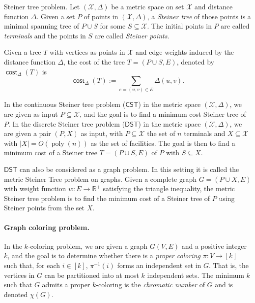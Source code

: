 \documentclass{article}\providecommand{\DeclareRedundantLanguages}[2]{}\usepackage[a4paper,margin=20mm]{geometry}
\DeclareMathOperator{\cost}{\mathsf{cost}}
\DeclareMathOperator{\poly}{poly}
\newcommand{\1}{\textbf{1}}
\newcommand{\cst}{$\mathsf{CST}$\xspace}
\newcommand{\dst}{$\mathsf{DST}$\xspace}
\begin{document}
\begin{paragraph}{Steiner tree problem.}  Let  $(\mathcal{X}, \Delta)$ be a metric space on set $\mathcal{X}$ and distance function $\Delta$. 
Given a set $P$ of points in $(\mathcal{X}, \Delta)$, a \textit{Steiner tree} of those points is a minimal spanning tree of $P \cup S$ for some $S\subseteq \mathcal{X}$. The initial points in $P$ are called \textit{terminals} and the points in $S$ are called \textit{Steiner points}. 

Given a tree $T$ with vertices as points in $\mathcal{X}$ and edge weights induced by the distance function $\Delta$, the cost of the tree $T = (P \cup S, E)$, denoted by $\cost_{\Delta}(T)$ is 
\[
 \cost_{\Delta}(T):=\sum_{e = (u,v) \in E} \Delta(u, v).
\]


In the continuous Steiner tree problem (\cst) in the metric space $(\mathcal{X}, \Delta)$, we are given as input $P \subseteq \mathcal{X}$, and the goal is to find a minimum cost Steiner tree of $P$. In the discrete Steiner tree problem (\dst) in the metric space $(\mathcal{X}, \Delta)$, we are given a pair $(P, X)$ as input, with $P \subseteq \mathcal{X}$ the set of $n$ terminals and $X \subseteq \mathcal{X}$ with $|X| = O(\poly(n))$ as the set of facilities. The goal is then to find a minimum cost of a Steiner tree $T = (P \cup S, E)$ of $P$ with  $S \subseteq X$.



\dst can also be considered as a graph problem. In this setting it is called the metric Steiner Tree problem on graphs. Given a complete graph $G = (P \cup X, E)$ with weight function $w : E \to \mathbb{R}^{+}$ satisfying the triangle inequality, the metric Steiner tree problem is to find the minimum cost of a Steiner tree of $P$ using Steiner points from the set $X$.
\end{paragraph}

\paragraph{Graph coloring problem.} In the $k$-coloring problem, we are given a graph $G(V,E)$ and a positive integer $k$, and the goal is to determine whether there is a \textit{proper coloring} $\pi: V \to [k]$ such that, for each $i \in [k]$, $\pi^{-1}(i)$ forms an independent set in $G$. That is, the vertices in $G$ can be partitioned into at most $k$ independent sets. The minimum $k$ such that $G$ admits a proper $k$-coloring is the \textit{chromatic number} of $G$ and is denoted $\chi(G)$.
\end{document}
